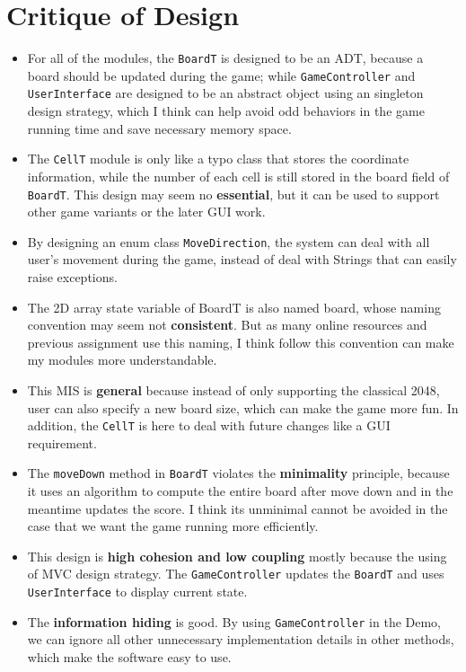 \documentclass[12pt]{article}
\begin{document}
\section*{Critique of Design}
\begin{itemize}
\item For all of the modules, the \verb|BoardT| is designed to be an ADT, because a board should be updated during the game; while \verb|GameController| and \verb|UserInterface| are designed to be an abstract object using an singleton design strategy, which I think can help avoid odd behaviors in the game running time and save necessary memory space.
\item The \verb|CellT| module is only like a typo class that stores the coordinate information, while the number of each cell is still stored in the board field of \verb|BoardT|. This design may seem no
\textbf{essential}, but it can be used to support other game variants or the later GUI work.
\item By designing an enum class \verb|MoveDirection|, the system can deal with all user's movement during the game, instead of deal with Strings that can easily raise exceptions.
\item The 2D array state variable of BoardT is also named board, whose naming convention may seem not \textbf{consistent}. But as many online resources and previous assignment use this naming, I think follow this convention can make my modules more understandable.
\item This MIS is \textbf{general} because instead of only supporting the classical 2048, user can also specify a new board size, which can make the game more fun. In addition, the \verb|CellT| is here to deal with future changes like a GUI requirement.
\item The \verb|moveDown| method in \verb|BoardT| violates the \textbf{minimality} principle, because it uses an algorithm to compute the entire board after move down and in the meantime updates the score. I think its unminimal cannot be avoided in the case that we want the game running more efficiently.
\item This design is \textbf{high cohesion and low coupling} mostly because the using of MVC design strategy. The \verb|GameController| updates the \verb|BoardT| and uses \verb|UserInterface| to display current state.
\item The \textbf{information hiding} is good. By using \verb|GameController| in the Demo, we can ignore all other unnecessary implementation details in other methods, which make the software easy to use.\

\end{itemize}
\end{document}
